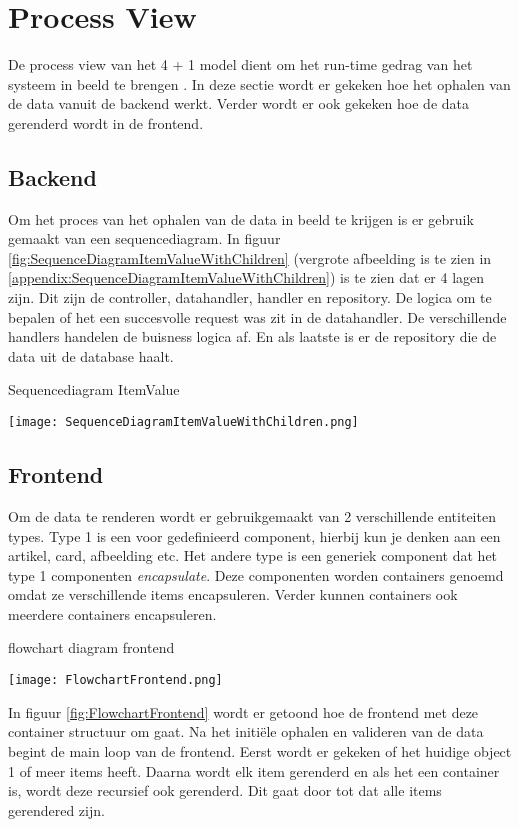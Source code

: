 \section{Process View}
De process view van het 4 + 1 model dient om het run-time gedrag van het systeem in beeld te brengen \parencite{4p1Model}.
In deze sectie wordt er gekeken hoe het ophalen van de data vanuit de backend werkt.
Verder wordt er ook gekeken hoe de data gerenderd wordt in de frontend.

\subsection{Backend}
Om het proces van het ophalen van de data in beeld te krijgen is er gebruik gemaakt van een sequencediagram.
In figuur \ref{fig:SequenceDiagramItemValueWithChildren} (vergrote afbeelding is te zien in \ref{appendix:SequenceDiagramItemValueWithChildren}) is te zien dat er 4 lagen zijn. 
Dit zijn de controller, datahandler, handler en repository.
De logica om te bepalen of het een succesvolle request was zit in de datahandler.
De verschillende handlers handelen de buisness logica af.
En als laatste is er de repository die de data uit de database haalt.

\whitespace
\begin{graphic}
    \captionsetup{type=figure}
    \caption{Sequencediagram ItemValue}
    \texttt{[image: SequenceDiagramItemValueWithChildren.png]}
    \label{fig:SequenceDiagramItemValueWithChildren}
\end{graphic}

\newpage
\subsection{Frontend}

Om de data te renderen wordt er gebruikgemaakt van 2 verschillende entiteiten types.
Type 1 is een voor gedefinieerd component, hierbij kun je denken aan een artikel, card, afbeelding etc.
Het andere type is een generiek component dat het type 1 componenten \textit{encapsulate}.
Deze componenten worden containers genoemd omdat ze verschillende items encapsuleren.
Verder kunnen containers ook meerdere containers encapsuleren.


\whitespace
\begin{graphic}
    \captionsetup{type=figure}
    \caption{flowchart diagram frontend}
    \texttt{[image: FlowchartFrontend.png]}
    \label{fig:FlowchartFrontend}
\end{graphic}

\whitespace
In figuur \ref{fig:FlowchartFrontend} wordt er getoond hoe de frontend met deze container structuur om gaat.
Na het initiële ophalen en valideren van de data begint de main loop van de frontend.
Eerst wordt er gekeken of het huidige object 1 of meer items heeft.
Daarna wordt elk item gerenderd en als het een container is, wordt deze recursief ook gerenderd.
Dit gaat door tot dat alle items gerendered zijn.

